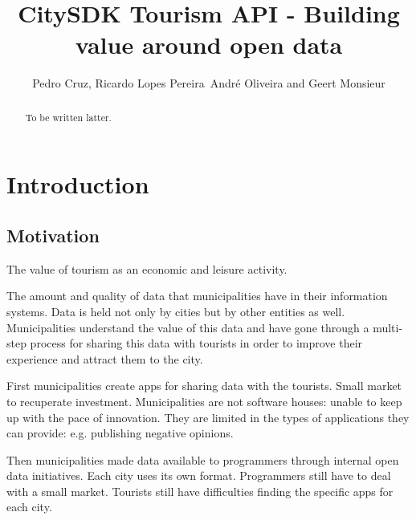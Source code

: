\documentclass[times]{ettauth}
\begin{document}




\title{CitySDK Tourism API - Building value around open data}
\author{Pedro Cruz,
Ricardo Lopes Pereira\corrauth\,
Andr\'e Oliveira and 
Geert Monsieur}
\address{
 Instituto Superior T\'ecnico, Avenida Rovisco Pais 1, 1049-001 Lisboa, Portugal\\
 INESC-ID, Av. Prof. Dr. Cavaco Silva, 2744-016 Porto Salvo, Portugal\\
 ISA\\
 Geert's address
}

\begin{abstract}
To be written latter.
\end{abstract}

\maketitle

\acresetall
\section{Introduction}

\subsection{Motivation}
The value of tourism as an economic and leisure activity.

The amount and quality of data that municipalities have in their information systems. 
Data is held not only by cities but by other entities as well.
Municipalities understand the value of this data and have gone through a multi-step process for sharing this data with tourists in order to improve their experience and attract them to the city.

First municipalities create apps for sharing data with the tourists.
Small market to recuperate investment.
Municipalities are not software houses: unable to keep up with the pace of innovation. 
They are limited in the types of applications they can provide: e.g. publishing negative opinions.

Then municipalities made data available to programmers through internal open data initiatives.
Each city uses its own format.
Programmers still have to deal with a small market.
Tourists still have difficulties finding the specific apps for each city.
\end{document}
